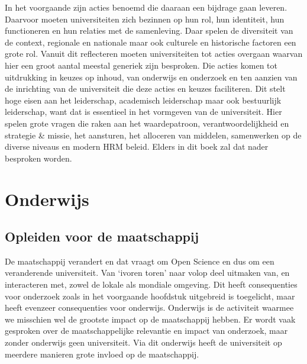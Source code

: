 \documentclass{jote-book}
\begin{document}
	In het voorgaande zijn acties benoemd die daaraan een bijdrage gaan leveren. Daarvoor moeten universiteiten zich bezinnen op hun rol, hun identiteit, hun functioneren en hun relaties met de samenleving. Daar spelen de diversiteit van de context, regionale en nationale maar ook culturele en historische factoren een grote rol. Vanuit dit reflecteren moeten universiteiten tot acties overgaan waarvan hier een groot aantal meestal generiek zijn besproken. Die acties komen tot uitdrukking in keuzes op inhoud, van onderwijs en onderzoek en ten aanzien van de inrichting van de universiteit die deze acties en keuzes faciliteren. Dit stelt hoge eisen aan het leiderschap, academisch leiderschap maar ook bestuurlijk leiderschap, want dat is essentieel in het vormgeven van de universiteit. Hier spelen grote vragen die raken aan het waardepatroon, verantwoordelijkheid en strategie \& missie, het aansturen, het alloceren van middelen, samenwerken op de diverse niveaus en modern HRM beleid. Elders in dit boek zal dat nader besproken worden.







	\chapter{Onderwijs}



















	\section{Opleiden voor de maatschappij}



	De maatschappij verandert en dat vraagt om Open Science en dus om een veranderende universiteit. Van ‘ivoren toren' naar volop deel uitmaken van, en interacteren met, zowel de lokale als mondiale omgeving. Dit heeft consequenties voor onderzoek zoals in het voorgaande hoofdstuk uitgebreid is toegelicht, maar heeft evenzeer consequenties voor onderwijs. Onderwijs is de activiteit waarmee we misschien wel de grootste impact op de maatschappij hebben. Er wordt vaak gesproken over de maatschappelijke relevantie en impact van onderzoek, maar zonder onderwijs geen universiteit. Via dit onderwijs heeft de universiteit op meerdere manieren grote invloed op de maatschappij.
\end{document}
